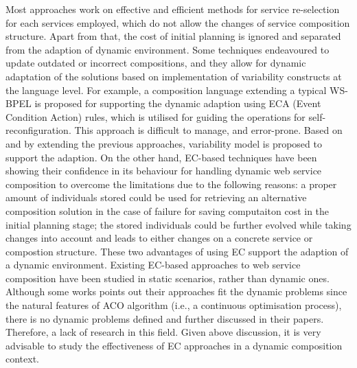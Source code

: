 Most approaches work on effective and efficient methods for service re-selection for each services employed, which do not allow the changes of service composition structure. Apart from that, the cost of initial planning is ignored and separated from the adaption of dynamic environment. Some techniques \cite{andrews2003business,baresi2011self,koning2009vxbpel} endeavoured to update outdated or incorrect compositions, and they allow for dynamic adaptation of the solutions based on implementation of variability constructs at the language level. For example, a composition language extending a typical WS-BPEL \cite{andrews2003business} is proposed for supporting the dynamic adaption using ECA (Event Condition Action) rules, which is utilised for guiding the operations for self-reconfiguration. This approach is difficult to manage, and error-prone. Based on and by extending the previous approaches, variability model \cite{alferez2014dynamic} is proposed to support the adaption. On the other hand, EC-based techniques have been showing their confidence in its behaviour for handling dynamic web service composition to overcome the limitations due to the following reasons: a proper amount of individuals stored could be used for retrieving an alternative composition solution in the case of failure for saving computaiton cost in the initial planning stage; the stored individuals could be further evolved while taking changes into account and leads to either changes on a concrete service or compostion structure. These two advantages of using EC support the adaption of a dynamic environment. Existing EC-based approaches to web service composition have been studied in static scenarios, rather than dynamic ones. Although some works \cite{feng2013dynamic,liu2005dynamic} points out their approaches fit the dynamic problems since the natural features of ACO algorithm (i.e., a continuous optimisation process), there is no dynamic problems defined and further discussed in their papers. Therefore, a lack of research in this field. Given above discussion, it is very advisable to study the effectiveness of EC approaches in a dynamic composition context.


